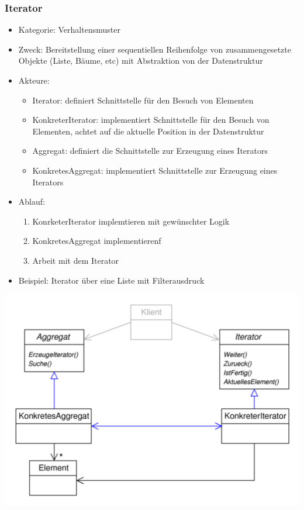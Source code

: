 \documentclass[11pt, fleqn, a4paper, leqno]{scrartcl} %
\begin{document}
		\subsubsection{Iterator}
			\begin{itemize}
				\item Kategorie: Verhaltensmuster
				\item Zweck: Bereitstellung einer sequentiellen Reihenfolge von zusammengesetzte Objekte (Liste, Bäume, etc) mit Abstraktion von der Datenstruktur
				\item Akteure: 
					\begin{itemize}
						\item Iterator: definiert Schnittstelle für den Besuch von Elementen
						\item KonkreterIterator: implementiert Schnittstelle für den Besuch von Elementen, achtet auf die aktuelle Position in der Datenstruktur
						\item Aggregat: definiert die Schnittstelle zur Erzeugung eines Iterators
						\item KonkretesAggregat: implementiert Schnittstelle zur Erzeugung eines Iterators
					\end{itemize}
				\item Ablauf:
					\begin{enumerate}
						\item KonrketerIterator implemtieren mit gewünschter Logik
						\item KonkretesAggregat implementierenf
						\item Arbeit mit dem Iterator
					\end{enumerate}
				\item Beispiel: Iterator über eine Liste mit Filterausdruck
			\end{itemize}
			\includegraphics[scale=0.8]{images/iterator.png}
			\newpage
\end{document}
